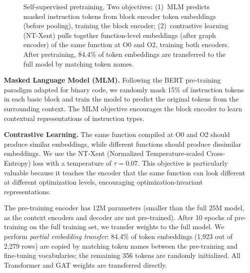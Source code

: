 \documentclass[sigconf,nonacm]{acmart}
\begin{document}
\begin{figure}[t]
{%
    }%
    \caption{Self-supervised pretraining. Two objectives: (1)~MLM predicts masked instruction tokens from block encoder token embeddings (before pooling), training the block encoder; (2)~contrastive learning (NT-Xent) pulls together function-level embeddings (after graph encoder) of the same function at O0 and O2, training both encoders. After pretraining, 84.4\% of token embeddings are transferred to the full model by matching token names.}
    \label{fig:pretraining}
\end{figure}

\textbf{Masked Language Model (MLM).} Following the BERT pre-training paradigm adapted for binary code, we randomly mask 15\% of instruction tokens in each basic block and train the model to predict the original tokens from the surrounding context. The MLM objective encourages the block encoder to learn contextual representations of instruction types.

\textbf{Contrastive Learning.} The same function compiled at O0 and O2 should produce similar embeddings, while different functions should produce dissimilar embeddings. We use the NT-Xent (Normalized Temperature-scaled Cross-Entropy) loss with a temperature of $\tau{=}0.07$. This objective is particularly valuable because it teaches the encoder that the same function can look different at different optimization levels, encouraging optimization-invariant representations.

The pre-training encoder has 12M parameters (smaller than the full 25M model, as the context encoders and decoder are not pre-trained). After 10 epochs of pre-training on the full training set, we transfer weights to the full model. We perform \emph{partial embedding transfer}: 84.4\% of token embeddings (1,923 out of 2,279 rows) are copied by matching token names between the pre-training and fine-tuning vocabularies; the remaining 356 tokens are randomly initialized. All Transformer and GAT weights are transferred directly.
\end{document}
